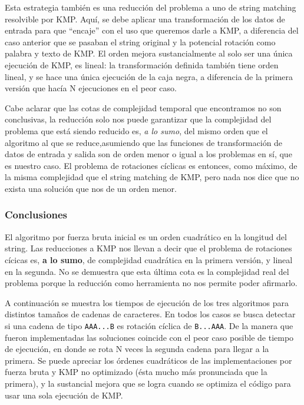 \documentclass{article}
\begin{document}
Esta estrategia también es una reducción del problema a uno de string matching resolvible por KMP. Aquí, se debe aplicar una transformación de los datos de entrada para que ``encaje'' con el uso que queremos darle a KMP, a diferencia del caso anterior que se pasaban el string original y la potencial rotación como palabra y texto de KMP. El orden mejora sustancialmente al solo ser una única ejecución de KMP, es lineal: la transformación definida también tiene orden lineal, y se hace una única ejecución de la caja negra, a diferencia de la primera versión que hacía N ejecuciones en el peor caso.

Cabe aclarar que las cotas de complejidad temporal que encontramos no son conclusivas, la reducción solo nos puede garantizar que la complejidad del problema que está siendo reducido es, \textit{a lo sumo}, del mismo orden que el algoritmo al que se reduce,asumiendo que las funciones de transformación de datos de entrada y salida son de orden menor o igual a los problemas en sí, que es nuestro caso. El problema de rotaciones cíclicas es entonces, como máximo, de la misma complejidad que el string matching de KMP, pero nada nos dice que no exista una solución que nos de un orden menor. 

\subsubsection{Conclusiones}
El algoritmo por fuerza bruta inicial es un orden cuadrático en la longitud del string. Las reducciones a KMP nos llevan a decir que el problema de rotaciones cícicas es, \textbf{a lo sumo}, de complejidad cuadrática en la primera versión, y lineal en la segunda. No se demuestra que esta última cota es la complejidad real del problema porque la reducción como herramienta no nos permite poder afirmarlo.

A continuación se muestra los tiempos de ejecución de los tres algoritmos para distintos tamaños de cadenas de caracteres. En todos los casos se busca detectar si una cadena de tipo \texttt{AAA...B} es rotación cíclica de \texttt{B...AAA}. De la manera que fueron implementadas las soluciones coincide con el peor caso posible de tiempo de ejecución, en donde se rota N veces la segunda cadena para llegar a la primera. Se puede apreciar los órdenes cuadráticos de las implementaciones por fuerza bruta y KMP no optimizado (ésta mucho más pronunciada que la primera), y la sustancial mejora que se logra cuando se optimiza el código para usar una sola ejecución de KMP.
\end{document}
